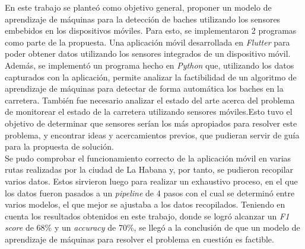 \begin{conclusions}
	En este trabajo se planteó como objetivo general, proponer un modelo de aprendizaje de máquinas para la detección de baches
	utilizando los sensores embebidos en los dispositivos móviles. Para esto, se implementaron 2 programas como parte de la propuesta.
	Una aplicación móvil desarrollada en \emph{Flutter} para poder obtener datos utilizando los sensores integrados de un dispositivo
	móvil. Además, se implementó un programa hecho en \emph{Python} que, utilizando los datos capturados con la aplicación, 
	permite analizar la factibilidad de un algoritmo de aprendizaje de máquinas para detectar de forma automática los baches en 
	la carretera. También fue necesario analizar el estado del arte acerca del problema de monitorear el estado de la carretera 
	utilizando sensores móviles.Esto tuvo el objetivo de determinar que sensores serían los más apropiados para resolver este problema, 
	y encontrar ideas y acercamientos previos, que pudieran servir de guía para la propuesta de solución.\\

	Se pudo comprobar el funcionamiento correcto de la aplicación móvil en varias rutas realizadas por la ciudad de La Habana y, 
	por tanto, se pudieron recopilar varios datos. Estos sirvieron luego para realizar un exhaustivo proceso, en el que los datos 
	fueron pasados a un \emph{pipeline} de 4 pasos con el cual se determinó entre varios modelos, el que mejor se ajustaba a los
	datos recopilados. Teniendo en cuenta los resultados obtenidos en este trabajo, donde se logró alcanzar un \emph{F1 score} de
	68\% y un \emph{accuracy} de 70\%, se llegó a la conclusión de que un modelo de aprendizaje de máquinas para resolver el
	problema en cuestión es factible.
\end{conclusions}
